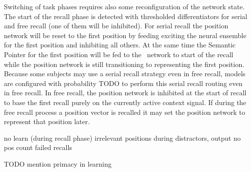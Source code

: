 Switching of task phases requires also some reconfiguration of the network state.
The start of the recall phase is detected with thresholded differentiators for serial and free recall (one of them will be inhibited).
For serial recall the position network will be reset to the first position by feeding exciting the neural ensemble for the first position and inhibiting all others.
At the same time the Semantic Pointer for the first position will be fed to the \mft\ network to start of the recall while the position network is still transitioning to representing the first position.
Because some subjects may use a serial recall strategy even in free recall, models are configured with probability TODO to perform this serial recall routing even in free recall.
In free recall, the position network is inhibited at the start of recall to base the first recall purely on the currently active context signal.
If during the free recall process a position vector is recalled it may set the position network to represent that position later.

no learn (during recall phase)
irrelevant positions during distractors, output no pos count
failed recalls

TODO mention primacy in learning

